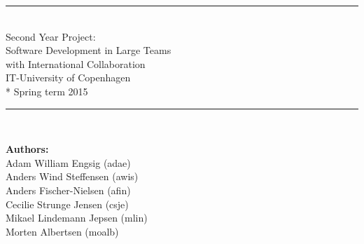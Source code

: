 \begin{titlepage}

\begin{center}


\vspace{67mm}

\rule{\textwidth}{1mm}\\
\vspace*{17mm}
\huge{
Second Year Project: \\ 
Software Development in Large Teams \\
with International Collaboration \\ 
\vspace*{8mm}
IT-University of Copenhagen \\*
Spring term 2015
}
\vspace*{7mm}

\rule{\textwidth}{1mm}\\

\vspace*{19mm}


\begin{Large}
\textbf{Authors:} \\
\vspace*{2mm}
Adam William Engsig  (adae)\\
Anders Wind Steffensen (awis) \\
Anders Fischer-Nielsen (afin) \\
Cecilie Strunge Jensen (csje) \\
Mikael Lindemann Jepsen (mlin) \\
Morten Albertsen (moalb)
\end{Large}
\end{center}
\end{titlepage}
\newpage